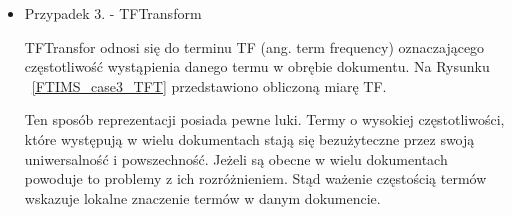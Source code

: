 \documentclass{classrep}
\begin{document}
\begin{itemize}
    Rysunek ~\ref{StopwordsHandler_before} przedstawia statystyki atrybutów przed zastosowaniem mechanizmu StopwordsHandler. Po aktywowaniu tego filtra widać zmianę ilość atrybutów oraz brak wcześniej zaobserwowanego termu ("od")  Rysunek ~\ref{StopwordsHandler_after}.
   
    \begin{figure}[H] 
    	\begin{center}
        \caption{Statystki zbioru przed zastosowaniem mechanizmu StopwordsHandler}
        \label{StopwordsHandler_before}
    	\end{center}
    \end{figure}   
    \begin{figure}[H] 
    	\begin{center}
        \caption{Ustawienia mechanizmu StopwordsHandler}
        \label{StopwordsHandler_conf}
    	\end{center}
    \end{figure}
   
    \begin{figure}[H] 
    	\begin{center}
        \caption{Statystki zbioru po zastosowaniem mechanizmu StopwordsHandler}
        \label{StopwordsHandler_after}
    	\end{center}
    \end{figure}


 \item  Przypadek 3. - TFTransform
    
    TFTransfor odnosi się do terminu TF (ang. term frequency) oznaczającego częstotliwość wystąpienia danego termu w obrębie dokumentu. Na Rysunku ~\ref{FTIMS_case3_TFT} przedstawiono obliczoną miarę TF.
    
    Ten sposób reprezentacji posiada pewne luki. Termy o wysokiej częstotliwości, które występują w wielu dokumentach stają się bezużyteczne przez swoją uniwersalność i powszechność. Jeżeli są obecne w wielu dokumentach powoduje to problemy z ich rozróżnieniem. Stąd ważenie częstością termów wskazuje lokalne znaczenie termów w danym dokumencie.
    
    \begin{table}[H]
    \centering
    \caption{Parametry zastosowanego filtra StringToWordVector dla przypadku 3.}
    \label{tab:apriori_num_params}
    \end{table}
   

\end{itemize}
\end{document}
